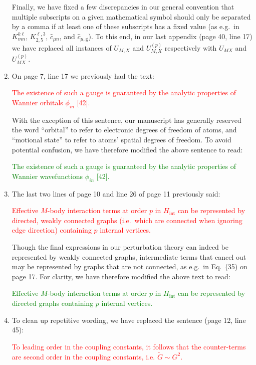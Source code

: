 \documentclass[preprint]{revtex4-1}
\renewcommand{\t}{\text} %
\newcommand{\g}{\text{g}}
\renewcommand{\c}{\hat{c}}
\newcommand{\1}{\mathds{1}}
\newcommand{\red}[1]{\textcolor{red}{#1}}
\newcommand{\green}[1]{\textcolor{green}{#1}}
\begin{document}
\begin{enumerate}[label=(R3.\arabic*)]
  Finally, we have fixed a few discrepancies in our general convention
  that multiple subscripts on a given mathematical symbol should only
  be separated by a comma if at least one of these subscripts has a
  fixed value (as e.g.~in $K^{k\ell}_{mn}$, $K^{\ell,3}_{2,5}$,
  $\c_{\mu n}$, and $\c_{\mu,\g}$).  To this end, in our last appendix
  (page 40, line 17) we have replaced all instances of $U_{M,X}$ and
  $U_{M,X}^{(p)}$ respectively with $U_{MX}$ and $U_{MX}^{(p)}$.


\item On page 7, line 17 we previously had the text:

  \red{The existence of such a gauge is guaranteed by the analytic
    properties of Wannier orbitals $\phi_{in}$ [42].}

  With the exception of this sentence, our manuscript has generally
  reserved the word ``orbital'' to refer to electronic degrees of
  freedom of atoms, and ``motional state'' to refer to atoms' spatial
  degrees of freedom.  To avoid potential confusion, we have therefore
  modified the above sentence to read:

  \green{The existence of such a gauge is guaranteed by the analytic
    properties of Wannier wavefunctions $\phi_{in}$ [42].}


\item The last two lines of page 10 and line 26 of page 11 previously
  said:

  \red{Effective $M$-body interaction terms at order $p$ in
    $H_{\t{int}}$ can be represented by directed, weakly connected
    graphs (i.e.~which are connected when ignoring edge direction)
    containing $p$ internal vertices.}

  Though the final expressions in our perturbation theory can indeed
  be represented by weakly connected graphs, intermediate terms that
  cancel out may be represented by graphs that are not connected, as
  e.g.~in Eq.~(35) on page 17.  For clarity, we have therefore
  modified the above text to read:

  \green{Effective $M$-body interaction terms at order $p$ in
    $H_{\t{int}}$ can be represented by directed graphs containing $p$
    internal vertices.}


\item To clean up repetitive wording, we have replaced the sentence
  (page 12, line 45):

  \red{To leading order in the coupling constants, it follows that the
    counter-terms are second order in the coupling constants,
    i.e. $\tilde G\sim G^2$.}


\end{enumerate}
\end{document}

